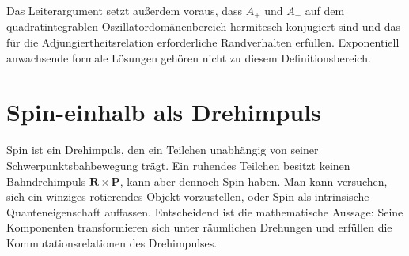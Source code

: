 \begin{classroomqa}
\end{classroomqa}

Das Leiterargument setzt außerdem voraus, dass \(A_{+}\) und \(A_{-}\) auf dem quadratintegrablen Oszillatordomänenbereich hermitesch konjugiert sind und das für die Adjungiertheitsrelation erforderliche Randverhalten erfüllen. Exponentiell anwachsende formale Lösungen gehören nicht zu diesem Definitionsbereich.

\begin{classroomqa}
\end{classroomqa}

\section{Spin-einhalb als Drehimpuls}

Spin ist ein Drehimpuls, den ein Teilchen unabhängig von seiner Schwerpunktsbahbewegung trägt. Ein ruhendes Teilchen besitzt keinen Bahndrehimpuls \(\mathbf R\times\mathbf P\), kann aber dennoch Spin haben. Man kann versuchen, sich ein winziges rotierendes Objekt vorzustellen, oder Spin als intrinsische Quanteneigenschaft auffassen. Entscheidend ist die mathematische Aussage: Seine Komponenten transformieren sich unter räumlichen Drehungen und erfüllen die Kommutationsrelationen des Drehimpulses.

